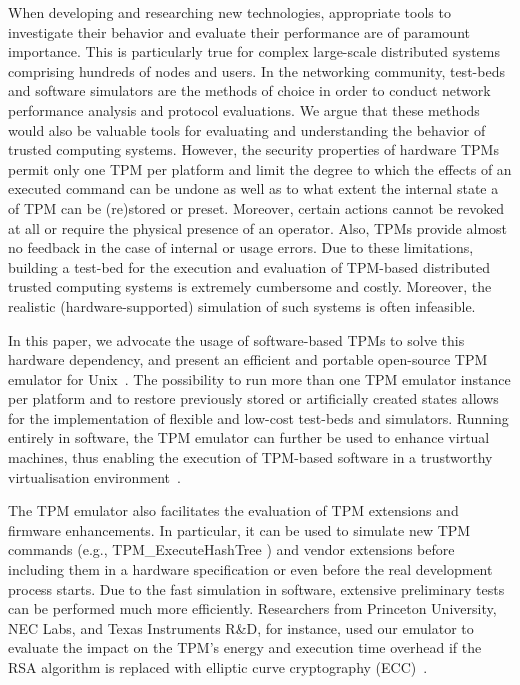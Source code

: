 \documentclass[runningheads]{llncs}
\begin{document}
When developing and researching new technologies, appropriate tools to
investigate their behavior and evaluate their performance are of paramount
importance. This is particularly true for complex large-scale distributed
systems comprising hundreds of nodes and users.
In the networking community, test-beds and software simulators are the methods
of choice in order to conduct network performance analysis and protocol
evaluations. We argue that these methods would also be valuable tools for
evaluating and understanding the behavior of trusted
computing systems. However, the security properties of hardware TPMs permit
only one TPM per platform and limit the degree to which the effects of an
executed command can be undone as well as to what extent the internal state
a of TPM can be (re)stored or preset. Moreover, certain actions cannot be
revoked at all or require the physical presence of an operator. Also, TPMs
provide almost no feedback in the case of internal or usage errors. Due to
these limitations, building a test-bed for the execution and evaluation of
TPM-based distributed trusted computing systems is extremely cumbersome and
costly. Moreover, the realistic (hardware-supported) simulation of such
systems is often infeasible.

In this paper, we advocate the usage of software-based TPMs to solve this
hardware dependency, and present an efficient and portable open-source TPM
emulator for Unix~\cite{TPMEmu}. The possibility to run more than one TPM
emulator instance per platform and to restore previously stored or
artificially created states allows for the implementation of flexible and
low-cost test-beds and simulators. Running entirely in software,
the TPM emulator can further be used to enhance virtual machines, thus
enabling the execution of TPM-based software in a trustworthy virtualisation
environment~\cite{Xen}.

The TPM emulator also facilitates the evaluation of TPM extensions and
firmware enhancements. In particular, it can be used to simulate new TPM
commands (e.g., \textsf{TPM\_ExecuteHashTree} \cite{Sarmenta})
and vendor extensions before including them in a hardware specification
or even before the real development process starts. Due to the fast
simulation in software, extensive preliminary tests can be performed much
more efficiently.
Researchers from Princeton University, NEC Labs, and Texas Instruments R\&D,
for instance, used our emulator to evaluate the impact on the TPM's energy
and execution time overhead if the RSA algorithm is replaced with elliptic
curve cryptography (ECC)~\cite{Aaraj}.
\end{document}
